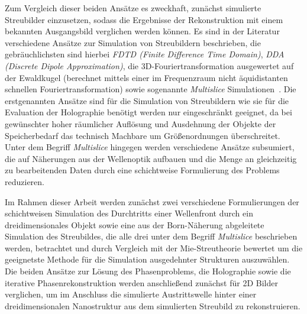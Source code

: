 Zum Vergleich dieser beiden Ansätze es zweckhaft, zunächst simulierte Streubilder einzusetzen, sodass die Ergebnisse der Rekonstruktion mit einem bekannten Ausgangsbild verglichen werden können. Es sind in der Literatur verschiedene Ansätze zur Simulation von Streubildern beschrieben, die gebräuchlichsten sind hierbei \textit{FDTD (Finite Difference Time Domain)}, \textit{DDA (Discrete Dipole Approximation)}, die 3D-Fouriertransformation ausgewertet auf der Ewaldkugel (berechnet mittels einer im Frequenzraum nicht äquidistanten schnellen Fouriertransformation) sowie sogenannte \textit{Multislice} Simulationen~\cite{drezek1999,sander2014,hantke2016,hare1994,barke2015}. Die erstgenannten Ansätze sind für die Simulation von Streubildern wie sie für die Evaluation der Holographie benötigt werden nur eingeschränkt geeignet, da bei gewünschter hoher räumlicher Auflösung und Ausdehnung der Objekte der Speicherbedarf das technisch Machbare um Größenordnungen überschreitet. Unter dem Begriff \textit{Multislice} hingegen werden verschiedene Ansätze subsumiert, die auf Näherungen aus der Wellenoptik aufbauen und die Menge an gleichzeitig zu bearbeitenden Daten durch eine schichtweise Formulierung des Problems reduzieren. 

Im Rahmen dieser Arbeit werden zunächst zwei verschiedene Formulierungen der schichtweisen Simulation des Durchtritts einer Wellenfront durch ein dreidimensionales Objekt sowie eine aus der Born-Näherung abgeleitete Simulation des Streubildes, die alle drei unter dem Begriff \textit{Multislice} beschrieben werden, betrachtet und durch Vergleich mit der Mie-Streutheorie bewertet um die geeignetste Methode für die Simulation ausgedehnter Strukturen auszuwählen. Die beiden Ansätze zur Lösung des Phasenproblems, die Holographie sowie die iterative Phasenrekonstruktion werden anschließend zunächst für 2D Bilder verglichen, um im Anschluss die simulierte Austrittswelle hinter einer dreidimensionalen Nanostruktur aus dem simulierten Streubild zu rekonstruieren.

